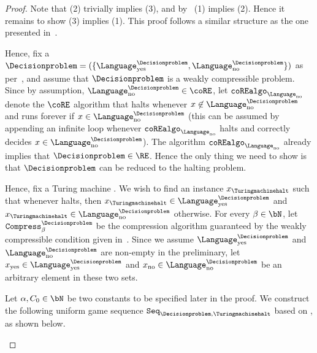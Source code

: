 \newcommand{\coREalgoproof}{\texttt{coREalgo}_{\Language_{\text{no}}}}
\newcommand{\UniformseqREproof}{\texttt{Seq}_{\Decisionproblem,\text{\Turingmachinehalt}}}

\begin{proof}
	Note that (2) trivially implies (3), and by~ (1) implies (2). Hence it remains to show (3) implies (1). This proof follows a similar structure as the one presented in~. 
	
	Hence, fix a $\Decisionproblem = (\{\Language_{\text{yes}}^\Decisionproblem, \Language_{\text{no}}^\Decisionproblem\})$ as per~, and assume that $\Decisionproblem$ is a weakly compressible problem. Since by assumption,  $\Language_{\text{no}}^\Decisionproblem \in \coRE$, let $\coREalgoproof$ denote the $\coRE$ algorithm that halts whenever $x \not\in \Language_{\text{no}}^\Decisionproblem$ and runs forever if $x \in \Language_{\text{no}}^\Decisionproblem$ (this can be assumed by appending an infinite loop whenever $\coREalgoproof$ halts and correctly decides $x \in \Language_{\text{no}}^\Decisionproblem$). The algorithm $\coREalgoproof$ already implies that $\Decisionproblem \in \RE$.  Hence the only thing we need to show is that $\Decisionproblem$ can be reduced to the halting problem. 
	
	Hence, fix a Turing machine \Turingmachinehalt. We wish to find an instance $x_{\text{\Turingmachinehalt}}$ such that whenever \Turingmachinehalt halts, then $x_{\text{\Turingmachinehalt}} \in \Language_{\text{yes}}^\Decisionproblem$ and $x_{\text{\Turingmachinehalt}} \in \Language_{\text{no}}^\Decisionproblem$ otherwise. For every $\beta \in \bN$, let $\texttt{Compress}_{\beta}^{\Decisionproblem}$ be the compression algorithm guaranteed by the weakly compressible condition given in~. Since we assume $\Language_{\text{yes}}^\Decisionproblem$ and $\Language_{\text{no}}^\Decisionproblem$ are non-empty in the preliminary, let $x_{\text{yes}} \in \Language_{\text{yes}}^\Decisionproblem$ and $x_{\text{no}} \in \Language_{\text{no}}^\Decisionproblem$ be an arbitrary element in these two sets.
	
	Let $\alpha, C_0 \in \bN$ be two constants to be specified later in the proof. We construct the following uniform game sequence $\texttt{Seq}_{\Decisionproblem,\text{\Turingmachinehalt}}$ based on \Turingmachinehalt, as shown below. 
	
	\vspace{10pt}
	\IncMargin{1em}
	\begin{algorithm}[H]
		\DontPrintSemicolon
		

\end{algorithm}
\end{proof}

